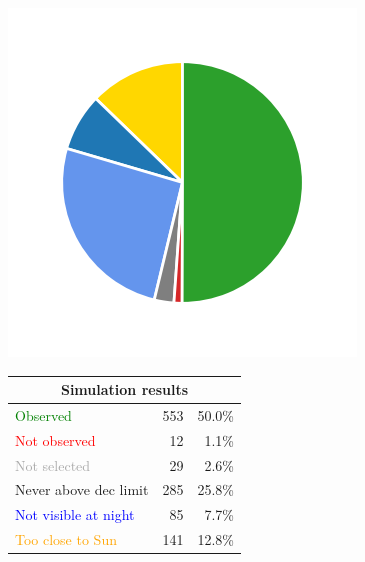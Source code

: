 \begin{colsection}
\begin{colsection}
\begin{figure}[p]
    \begin{center}
        \begin{minipage}[t]{0.15\textwidth}\vspace{0.6cm}
            \includegraphics[trim={.5cm 0 .5cm 0},clip,width=\linewidth]{images/gw_sims/1n8_pie.png}
        \end{minipage}
        \begin{minipage}[t]{0.45\textwidth}\vspace{0pt}
            \begin{tabular}{lrr}
                \multicolumn{3}{c}{\textbf{Simulation results}} \\
                \midrule
                \textcolor{Green}{Observed} & 553 & 50.0\% \\
                \textcolor{Red}{Not observed} & 12 & 1.1\% \\
                \textcolor{darkgray}{Not selected} & 29 & 2.6\% \\
                \textcolor{NavyBlue}{Never above dec limit} & 285 & 25.8\% \\
                \textcolor{Blue}{Not visible at night} & 85 & 7.7\% \\
                \textcolor{Orange}{Too close to Sun} & 141 & 12.8\% \\

\end{tabular}
\end{minipage}
\end{center}
\end{figure}
\end{colsection}
\end{colsection}
